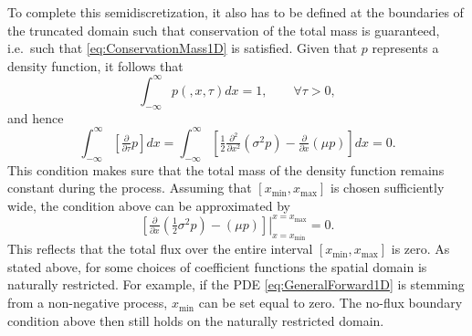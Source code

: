 \documentclass[10pt]{article}
\begin{document}
To complete this semidiscretization, it also has to be defined at the boundaries of the truncated domain such that conservation of the total mass is guaranteed, i.e.\ such that \eqref{eq:ConservationMass1D} is satisfied.
Given that $p$ represents a density function, it follows that
$$ \int_{-\infty}^{\infty} p(,x,\tau) dx = 1, \qquad \forall \tau > 0,$$
and hence
$$ \int_{-\infty}^{\infty} \left[ \tfrac{\partial}{\partial \tau} p \right] dx = \int_{-\infty}^{\infty} \left[ \tfrac{1}{2} \tfrac{\partial^{2}}{\partial x^{2}} \left( \sigma^{2}p \right) - \tfrac{\partial}{\partial x} \left( \mu p \right) \right] dx = 0. $$
This condition makes sure that the total mass of the density function remains constant during the process. 
Assuming that $[x_{\min},x_{\max}]$ is chosen sufficiently wide, the condition above can be approximated by
$$ \left. \left[ \tfrac{\partial}{\partial x} \left( \tfrac{1}{2} \sigma^{2}p \right) - \left( \mu p \right) \right]\right\vert^{x= x_{\max}}_{x=x_{\min}} = 0. $$
This reflects that the total flux over the entire interval $[x_{\min},x_{\max}]$ is zero. 
As stated above, for some choices of coefficient functions the spatial domain is naturally restricted. For example, if the PDE \eqref{eq:GeneralForward1D} is stemming from a non-negative process, $x_{\min}$ can be set equal to zero. The no-flux boundary condition above then still holds on the naturally restricted domain.
\end{document}
